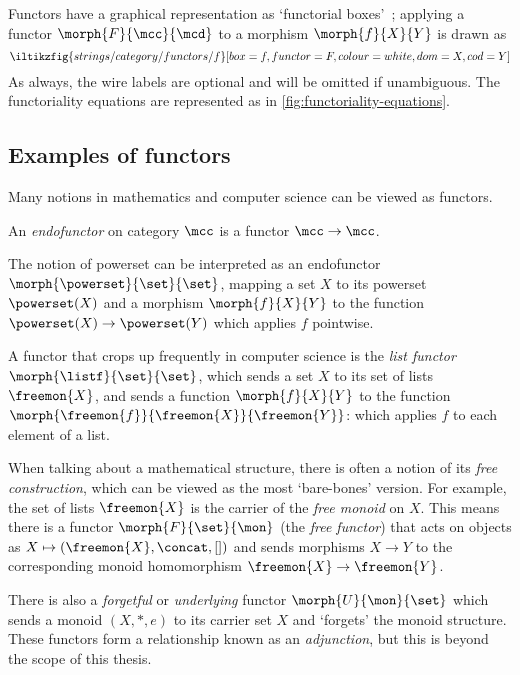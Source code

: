 Functors have a graphical representation as `functorial
boxes'~\cite{mellies2006functorial}; applying a functor \(\morph{F}{\mcc}{\mcd}\)
to a morphism \(\morph{f}{X}{Y}\) is drawn as
\[
    \iltikzfig{strings/category/functors/f}[box=f,functor=F,colour=white,dom=X,cod=Y]
\]
As always, the wire labels are optional and will be omitted if unambiguous.
The functoriality equations are represented as in
\cref{fig:functoriality-equations}.



\subsection{Examples of functors}

Many notions in mathematics and computer science can be viewed as functors.

\begin{definition}[Endofunctor]
    An \emph{endofunctor} on category \(\mcc\) is a functor \(\mcc \to \mcc\).
\end{definition}

\begin{example}
    The notion of powerset can be interpreted as an endofunctor \(
    \morph{\powerset}{\set}{\set}
    \), mapping a set \(X\) to its powerset \(\powerset(X)\) and a morphism
    \(\morph{f}{X}{Y}\) to the function \(\powerset(X) \to \powerset(Y)\) which
    applies \(f\) pointwise.
\end{example}

\begin{example}\label{ex:list-functor}
    A functor that crops up frequently in computer science is the
    \emph{list functor} \(\morph{\listf}{\set}{\set}\), which sends a set
    \(X\) to its set of lists \(\freemon{X}\), and sends a function
    \(\morph{f}{X}{Y}\) to the function
    \(\morph{\freemon{f}}{\freemon{X}}{\freemon{Y}}\): which applies \(f\)
    to each element of a list.
\end{example}

\begin{example}\label{ex:free-monoid}
    When talking about a mathematical structure, there is often a notion
    of its \emph{free construction}, which can be viewed as the most
    `bare-bones' version.
    For example, the set of lists \(\freemon{X}\) is the carrier of the
    \emph{free monoid} on \(X\).
    This means there is a functor \(\morph{F}{\set}{\mon}\) (the
    \emph{free functor}) that acts on objects as \(
    X \mapsto (\freemon{X}, \concat, [])
    \) and sends morphisms \(X \to Y\) to the corresponding monoid homomorphism
    \(\freemon{X} \to \freemon{Y}\).

    There is also a \emph{forgetful} or \emph{underlying} functor
    \(\morph{U}{\mon}{\set}\) which sends a monoid \((X, *, e)\) to its carrier
    set \(X\) and `forgets' the monoid structure.
    These functors form a relationship known as an \emph{adjunction}, but this
    is beyond the scope of this thesis.
\end{example}

